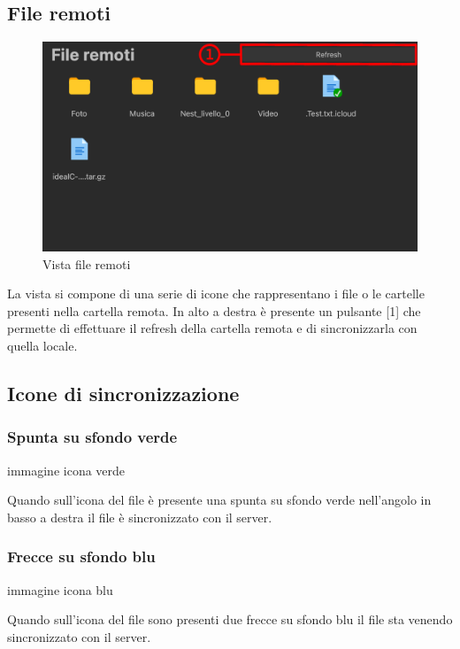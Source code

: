 \subsection{File remoti}
\label{sec:fileRemoti}
\begin{figure}[H]
    \centering
    \includegraphics[scale = 0.8]{components/img/fileRem.png}
    \caption{Vista file remoti}
    \label{fig:fileRem}
\end{figure}
La vista si compone di una serie di icone che rappresentano i file o le cartelle presenti nella cartella remota. In alto a destra è presente un pulsante [1] che permette di effettuare il refresh della cartella remota e di sincronizzarla con quella locale.

\subsection{Icone di sincronizzazione}
\label{sec:iconeSync}
\subsubsection{Spunta su sfondo verde}

immagine icona verde\newline

Quando sull'icona del file è presente una spunta su sfondo verde nell'angolo in basso a destra il file è sincronizzato con il server.
\subsubsection{Frecce su sfondo blu}

immagine icona blu\newline

Quando sull'icona del file sono presenti due frecce su sfondo blu il file sta venendo sincronizzato con il server.
